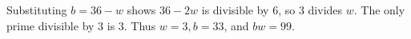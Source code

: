 Substituting $ b=36-w $ shows $ 36-2w $ is divisible by 6, so 3 divides $ w $. The only prime divisible by 3 is 3. Thus $ w=3,b=33 $, and $\boxed{bw=99}$.
